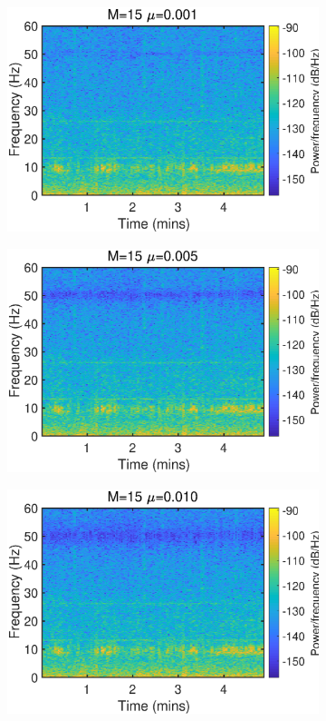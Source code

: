 \begin{figure}[htb]
\begin{subfigure}[b]{0.32\textwidth}
     \includegraphics[width=\textwidth]{fig/23/23d8.eps}
    \end{subfigure}
    \hspace{-0.4cm}
    \begin{subfigure}[b]{0.32\textwidth}
     \centering
     \includegraphics[width=\textwidth]{fig/23/23d9.eps}
    \end{subfigure}
    \hspace{-0.4cm}
    \begin{subfigure}[b]{0.32\textwidth}
     \centering
     \includegraphics[width=\textwidth]{fig/23/23d10.eps}

\end{subfigure}
\end{figure}

